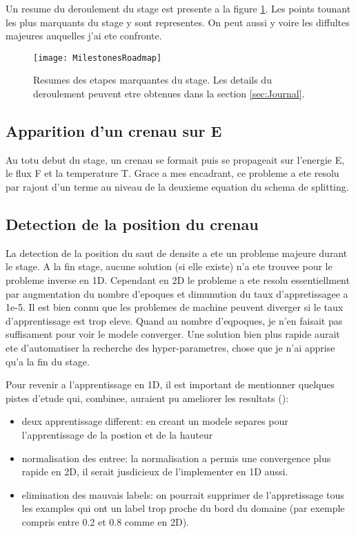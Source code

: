 Un resume du deroulement du stage est presente a la figure \ref{fig:MilestonesRoadmap}. Les points tounant les plus marquants du stage y sont representes. On peut aussi y voire les diffultes majeures auquelles j'ai ete confronte.

\begin{figure}[H] 
\centering
\texttt{[image: MilestonesRoadmap]} 
\decoRule
\caption[MilestonesRoadmap]{Resumes des etapes marquantes du stage. Les details du deroulement peuvent etre obtenues dans la section \ref{sec:Journal}.}
\label{fig:MilestonesRoadmap}
\end{figure}

\subsection{Apparition d'un crenau sur E}
Au totu debut du stage, un crenau se formait puis se propageait sur l'energie E, le flux F et la temperature T. Grace a mes encadrant, ce probleme a ete resolu par rajout d'un terme au niveau de la deuxieme equation du schema de splitting.

\subsection{Detection de la position du crenau}
La detection de la position du saut de densite a ete un probleme majeure durant le stage. A la fin stage, aucune solution (si elle existe) n'a ete trouvee pour le probleme inverse en 1D. 
Cependant en 2D le probleme a ete resolu essentiellment par augmentation du nombre d'epoques et dimunution du taux d'appretissagee a 1e-5. Il est bien connu que les problemes de machine peuvent diverger si le taux d'apprentissage est trop eleve. Quand au nombre d'eqpoques, je n'en faisait pas suffisament pour voir le modele converger. Une solution bien plus rapide aurait ete d'automatiser la recherche des hyper-parametres, chose que je n'ai apprise qu'a la fin du stage.

Pour revenir a l'apprentissage en 1D, il est important de mentionner quelques pistes d'etude qui, combinee, auraient pu ameliorer les resultats ():
\begin{itemize}
    \item deux apprentissage different: en creant un modele separes pour l'apprentissage de la postion  et de la hauteur
    \item normalisation des entree: la normalisation a permis une convergence plus rapide en 2D, il serait jusdicieux de l'implementer en 1D aussi.
    \item elimination des mauvais labels: on pourrait supprimer de l'appretissage tous les examples qui ont un label trop proche du bord du domaine (par exemple compris entre 0.2 et 0.8 comme en 2D).
\end{itemize}

